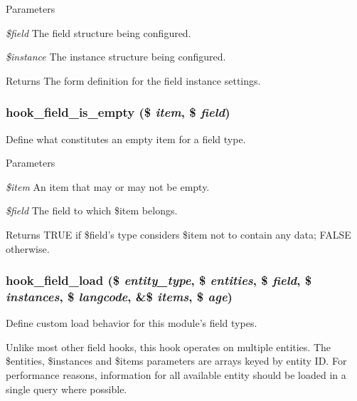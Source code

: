 \begin{DoxyParams}{Parameters}
\item[{\em \$field}]The field structure being configured. \item[{\em \$instance}]The instance structure being configured.\end{DoxyParams}
\begin{DoxyReturn}{Returns}
The form definition for the field instance settings. 
\end{DoxyReturn}
\hypertarget{group__field__types_ga192dd7e7a02a7bc9e0af8b67b187b071}{
\subsubsection[{hook\_\-field\_\-is\_\-empty}]{\setlength{\rightskip}{0pt plus 5cm}hook\_\-field\_\-is\_\-empty (\$ {\em item}, \/  \$ {\em field})}}
\label{group__field__types_ga192dd7e7a02a7bc9e0af8b67b187b071}
Define what constitutes an empty item for a field type.


\begin{DoxyParams}{Parameters}
\item[{\em \$item}]An item that may or may not be empty. \item[{\em \$field}]The field to which \$item belongs.\end{DoxyParams}
\begin{DoxyReturn}{Returns}
TRUE if \$field's type considers \$item not to contain any data; FALSE otherwise. 
\end{DoxyReturn}
\hypertarget{group__field__types_ga37f2456e9b5b8b39dc11cffd59163c19}{
\subsubsection[{hook\_\-field\_\-load}]{\setlength{\rightskip}{0pt plus 5cm}hook\_\-field\_\-load (\$ {\em entity\_\-type}, \/  \$ {\em entities}, \/  \$ {\em field}, \/  \$ {\em instances}, \/  \$ {\em langcode}, \/  \&\$ {\em items}, \/  \$ {\em age})}}
\label{group__field__types_ga37f2456e9b5b8b39dc11cffd59163c19}
Define custom load behavior for this module's field types.

Unlike most other field hooks, this hook operates on multiple entities. The \$entities, \$instances and \$items parameters are arrays keyed by entity ID. For performance reasons, information for all available entity should be loaded in a single query where possible.

